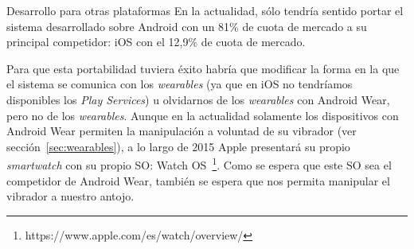 \begin{definitionlist}
  \item[Desarrollo para otras plataformas] En la actualidad, sólo tendría sentido portar el sistema
    desarrollado sobre Android con un 81\% de cuota de mercado a su principal competidor: iOS
    con el 12,9\% de cuota de mercado.

    Para que esta portabilidad tuviera éxito habría que modificar la forma en la que el sistema se
    comunica con los \emph{wearables} (ya que en iOS no tendríamos disponibles los \emph{Play
      Services}) u olvidarnos de los \emph{wearables} con Android Wear, pero no de los
    \emph{wearables}. Aunque en la actualidad solamente los dispositivos con Android Wear permiten
    la manipulación a voluntad de su vibrador (ver sección~\ref{sec:wearables}), a lo largo de 2015
    Apple presentará su propio \emph{smartwatch} con su propio \acs{SO}: Watch
    OS~\footnote{https://www.apple.com/es/watch/overview/}. Como se espera que este \acs{SO} sea el
    competidor de Android Wear, también se espera que nos permita manipular el vibrador a nuestro
    antojo.

\end{definitionlist} 

